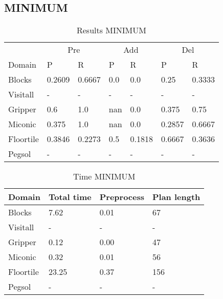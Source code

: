 \documentclass[]{article}
\begin{document}
\subsection{MINIMUM}
\begin{table}[H]
	\caption{Results MINIMUM}
	\label{tab:results_minimum}
	\begin{center}
		\begin{tabular}{l|l|l|l|l|l|l|}
			& \multicolumn{2}{|c|}{Pre} & \multicolumn{2}{|c|}{Add} & \multicolumn{2}{|c|}{Del}  \\ \cline{2-7}			 
			Domain & P & R & P & R & P & R \\
			\hline
			Blocks & 0.2609 & 0.6667 & 0.0 & 0.0 & 0.25 & 0.3333 \\
			Visitall & - & - & - & - & - & - \\
			Gripper & 0.6 & 1.0 & nan & 0.0 & 0.375 & 0.75 \\
			Miconic & 0.375 & 1.0 & nan & 0.0 & 0.2857 & 0.6667 \\
			Floortile & 0.3846 & 0.2273 & 0.5 & 0.1818 & 0.6667 & 0.3636 \\
			Pegsol & - & - & - & - & - & - \\
		\end{tabular}
	\end{center}	
\end{table}


\begin{table}[H]
	\caption{Time MINIMUM}
	\label{tab:time_minimum}
	\begin{center}
		\begin{tabular}{l|l|l|l|}			 
			Domain & Total time & Preprocess & Plan length  \\
			\hline
			Blocks & 7.62 & 0.01 & 67  \\
			Visitall & - & - & -  \\
			Gripper & 0.12 & 0.00 & 47  \\
			Miconic & 0.32 & 0.01 & 56  \\
			Floortile & 23.25 & 0.37 & 156 \\
			Pegsol & - & - & - \\
		\end{tabular}
	\end{center}	
\end{table}
\end{document}
